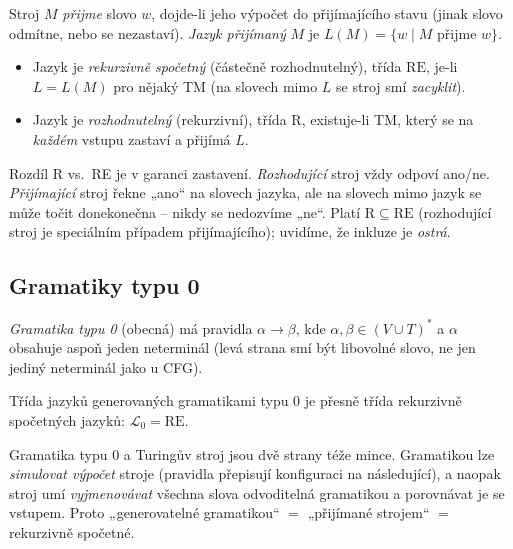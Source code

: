 \documentclass[11pt,a4paper]{article}
\begin{document}
\begin{definice}
Stroj $M$ \emph{přijme} slovo $w$, dojde-li jeho výpočet do přijímajícího stavu (jinak slovo odmítne, nebo se nezastaví). \emph{Jazyk přijímaný} $M$ je $L(M)=\{w\mid M$ přijme $w\}$.
\begin{itemize}
  \item Jazyk je \emph{rekurzivně spočetný} (částečně rozhodnutelný), třída $\mathrm{RE}$, je-li $L=L(M)$ pro nějaký TM (na slovech mimo $L$ se stroj smí \emph{zacyklit}).
  \item Jazyk je \emph{rozhodnutelný} (rekurzivní), třída $\mathrm R$, existuje-li TM, který se na \emph{každém} vstupu zastaví a přijímá $L$.
\end{itemize}
\end{definice}

\begin{intuice}
Rozdíl R vs.\ RE je v garanci zastavení. \emph{Rozhodující} stroj vždy odpoví ano/ne. \emph{Přijímající} stroj řekne „ano`` na slovech jazyka, ale na slovech mimo jazyk se může točit donekonečna -- nikdy se nedozvíme „ne``. Platí $\mathrm R\subseteq\mathrm{RE}$ (rozhodující stroj je speciálním případem přijímajícího); uvidíme, že inkluze je \emph{ostrá}.
\end{intuice}

\subsection{Gramatiky typu 0}

\begin{definice}
\emph{Gramatika typu 0} (obecná) má pravidla $\alpha\to\beta$, kde $\alpha,\beta\in(V\cup T)^*$ a $\alpha$ obsahuje aspoň jeden neterminál (levá strana smí být libovolné slovo, ne jen jediný neterminál jako u CFG).
\end{definice}

\begin{veta}[Typ 0 $=$ RE]
Třída jazyků generovaných gramatikami typu 0 je přesně třída rekurzivně spočetných jazyků: $\mathcal L_0=\mathrm{RE}$.
\end{veta}

\begin{intuice}
Gramatika typu 0 a Turingův stroj jsou dvě strany téže mince. Gramatikou lze \emph{simulovat výpočet} stroje (pravidla přepisují konfiguraci na následující), a naopak stroj umí \emph{vyjmenovávat} všechna slova odvoditelná gramatikou a porovnávat je se vstupem. Proto „generovatelné gramatikou`` $=$ „přijímané strojem`` $=$ rekurzivně spočetné.
\end{intuice}
\end{document}

